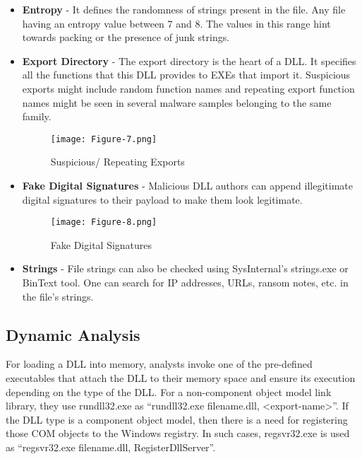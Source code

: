 \documentclass{article}
\begin{document}
\begin{itemize}
    \item \textbf{Entropy} -
    It defines the randomness of strings present in the file. Any file having an entropy value between 7 and 8. The values in this range hint towards packing or the presence of junk strings.

    \item \textbf{Export Directory} -
    The export directory is the heart of a DLL. It specifies all the functions that this DLL provides to EXEs that import it. Suspicious exports might include random function names and repeating export function names might be seen in several malware samples belonging to the same family.
    \begin{figure}[h]
        \centering
        \texttt{[image: Figure-7.png]}
        \newline
        \caption{Suspicious/ Repeating Exports}
    \end{figure}

    \item \textbf{Fake Digital Signatures} -
    Malicious DLL authors can append illegitimate digital signatures to their payload to make them look legitimate.
    \begin{figure}[h]
        \centering
        \texttt{[image: Figure-8.png]}
        \caption{Fake Digital Signatures}
    \end{figure}

    \item \textbf{Strings} -
    File strings can also be checked using SysInternal’s strings.exe or BinText tool. One can search for IP addresses, URLs, ransom notes, etc. in the file’s strings.
\end{itemize}

\subsection{Dynamic Analysis}

For loading a DLL into memory, analysts invoke one of the pre-defined executables that attach the DLL to their memory space and ensure its execution depending on the type of the DLL. For a non-component object model link library, they use rundll32.exe as “rundll32.exe filename.dll, <export-name>”. If the DLL type is a component object model, then there is a need for registering those COM objects to the Windows registry. In such cases, regsvr32.exe is used as “regsvr32.exe filename.dll, RegisterDllServer”.
\end{document}
